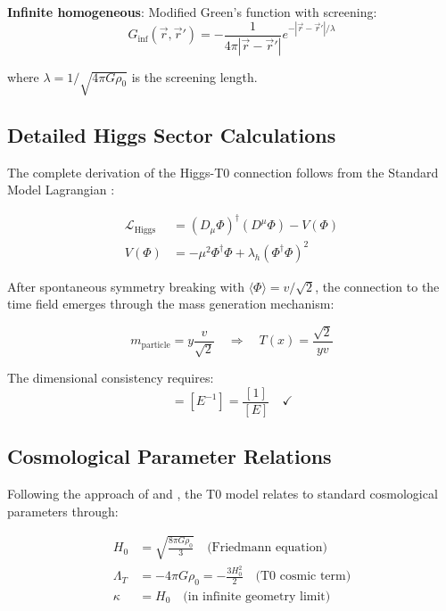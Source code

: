 \documentclass[12pt,a4paper]{article}
\begin{document}
	\textbf{Infinite homogeneous}: Modified Green's function with screening:
	\begin{equation}
		G_{\text{inf}}(\vec{r},\vec{r}') = -\frac{1}{4\pi|\vec{r}-\vec{r}'|} e^{-|\vec{r}-\vec{r}'|/\lambda}
	\end{equation}
	
	where $\lambda = 1/\sqrt{4\pi G \rho_0}$ is the screening length.
	
	\subsection{Detailed Higgs Sector Calculations}
	\label{app:higgs_calculations}
	
	The complete derivation of the Higgs-T0 connection follows from the Standard Model Lagrangian \citep{weinberg2003,peskin1995}:
	
	\begin{align}
		\mathcal{L}_{\text{Higgs}} &= (D_\mu \Phi)^\dagger (D^\mu \Phi) - V(\Phi) \\
		V(\Phi) &= -\mu^2 \Phi^\dagger \Phi + \lambda_h (\Phi^\dagger \Phi)^2
	\end{align}
	
	After spontaneous symmetry breaking with $\langle\Phi\rangle = v/\sqrt{2}$, the connection to the time field emerges through the mass generation mechanism:
	
	\begin{equation}
		m_{\text{particle}} = y \frac{v}{\sqrt{2}} \quad \Rightarrow \quad T(x) = \frac{\sqrt{2}}{y v}
	\end{equation}
	
	The dimensional consistency requires:
	\begin{equation}
		[T(x)] = [E^{-1}] = \frac{[1]}{[E]} \quad \checkmark
	\end{equation}
	
	\subsection{Cosmological Parameter Relations}
	\label{app:cosmological_parameters}
	
	Following the approach of \citet{weinberg2008} and \citet{peebles1993}, the T0 model relates to standard cosmological parameters through:
	
	\begin{align}
		H_0 &= \sqrt{\frac{8\pi G \rho_0}{3}} \quad \text{(Friedmann equation)} \\
		\Lambda_T &= -4\pi G \rho_0 = -\frac{3 H_0^2}{2} \quad \text{(T0 cosmic term)} \\
		\kappa &= H_0 \quad \text{(in infinite geometry limit)}
	\end{align}
	
\end{document}
